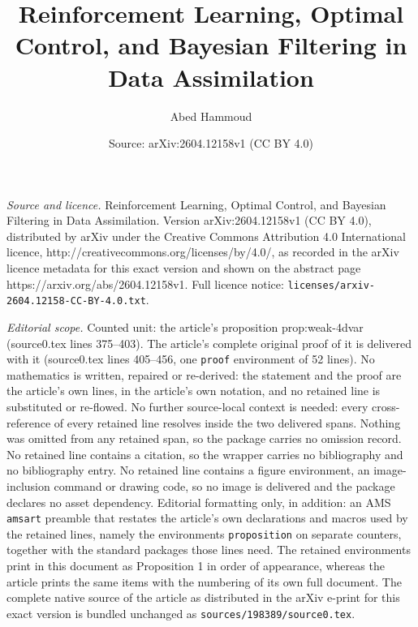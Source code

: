 \documentclass[10pt,a4paper]{amsart}
\title{Reinforcement Learning, Optimal Control, and Bayesian Filtering in Data Assimilation}
\author{Abed Hammoud}
\date{Source: arXiv:2604.12158v1 (CC BY 4.0)}
\begin{document}
\maketitle

\noindent\emph{Source and licence.} Reinforcement Learning, Optimal Control, and Bayesian Filtering in Data Assimilation. Version arXiv:2604.12158v1 (CC BY 4.0), distributed by arXiv under the Creative Commons Attribution 4.0 International licence, http://creativecommons.org/licenses/by/4.0/, as recorded in the arXiv licence metadata for this exact version and shown on the abstract page https://arxiv.org/abs/2604.12158v1. Full licence notice: \texttt{licenses/arxiv-2604.12158-CC-BY-4.0.txt}.\par\smallskip

\noindent\textit{Editorial scope.} Counted unit: the article's proposition prop:weak-4dvar (source0.tex lines 375--403). The article's complete original proof of it is delivered with it (source0.tex lines 405--456, one \texttt{proof} environment of 52 lines). No mathematics is written, repaired or re-derived: the statement and the proof are the article's own lines, in the article's own notation, and no retained line is substituted or re-flowed.  No further source-local context is needed: every cross-reference of every retained line resolves inside the two delivered spans.  Nothing was omitted from any retained span, so the package carries no omission record.  No retained line contains a citation, so the wrapper carries no bibliography and no bibliography entry.  No retained line contains a figure environment, an image-inclusion command or drawing code, so no image is delivered and the package declares no asset dependency.  Editorial formatting only, in addition: an AMS \texttt{amsart} preamble that restates the article's own declarations and macros used by the retained lines, namely the environments \texttt{proposition} on separate counters, together with the standard packages those lines need.  The retained environments print in this document as Proposition 1 in order of appearance, whereas the article prints the same items with the numbering of its own full document.  The complete native source of the article as distributed in the arXiv e-print for this exact version is bundled unchanged as \texttt{sources/198389/source0.tex}.
\end{document}
